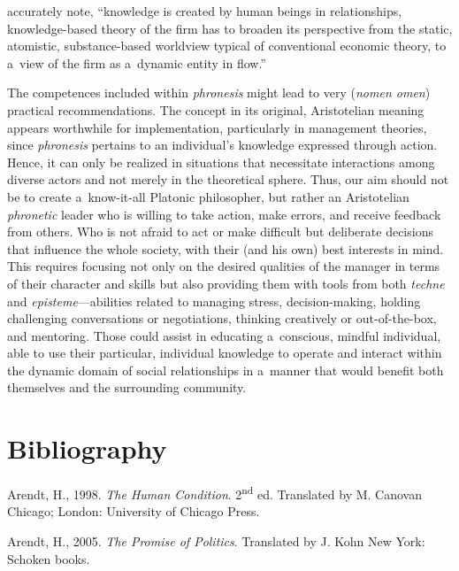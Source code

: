 \parencite*[][p.242]{} %
 accurately note, ``knowledge is created by human beings in relationships, knowledge-based theory of the firm has to broaden its perspective from the static, atomistic, substance-based worldview typical of conventional economic theory, to a~view of the firm as a~dynamic entity in flow.''



The competences included within \textit{phronesis} might lead to very (\textit{nomen omen}) practical recommendations. The concept in its original, Aristotelian meaning appears worthwhile for implementation, particularly in management theories, since \textit{phronesis} pertains to an individual's knowledge expressed through action. Hence, it can only be realized in situations that necessitate interactions among diverse actors and not merely in the theoretical sphere. Thus, our aim should not be to create a~know-it-all Platonic philosopher, but rather an Aristotelian \textit{phronetic} leader who is willing to take action, make errors, and receive feedback from others. Who is not afraid to act or make difficult but deliberate decisions that influence the whole society, with their (and his own) best interests in mind. This requires focusing not only on the desired qualities of the manager in terms of their character and skills but also providing them with tools from both \textit{techne} and \textit{episteme}---abilities related to managing stress, decision-making, holding challenging conversations or negotiations, thinking creatively or out-of-the-box, and mentoring. Those could assist in educating a~conscious, mindful individual, able to use their particular, individual knowledge to operate and interact within the dynamic domain of social relationships in a~manner that would benefit both themselves and the surrounding community.



\section{Bibliography}

Arendt, H., 1998. \textit{The Human Condition}. 2\textsuperscript{nd} ed. Translated by M. Canovan Chicago; London: University of Chicago Press.



Arendt, H., 2005. \textit{The Promise of Politics}. Translated by J. Kohn New York: Schoken books.



